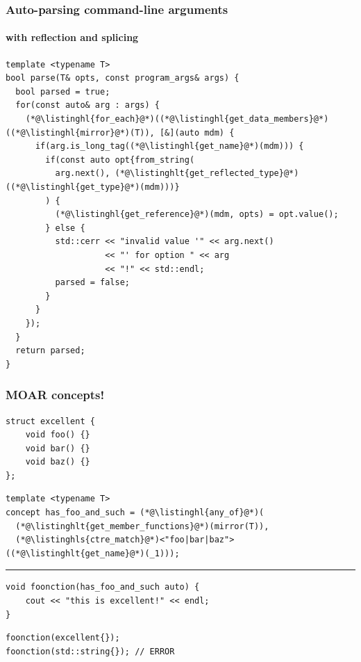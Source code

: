\documentclass[aspectratio=169,compress,table,xcolor=table]{beamer}
\begin{document}
\begin{frame}[fragile]
  \frametitle{Auto-parsing command-line arguments}
  \framesubtitle{with reflection and splicing}
  \begin{lstlisting}[language=c++2x,basicstyle=\scriptsize\ttfamily]
template <typename T>
bool parse(T& opts, const program_args& args) {
  bool parsed = true;
  for(const auto& arg : args) {
    (*@\listinghl{for_each}@*)((*@\listinghl{get_data_members}@*)((*@\listinghl{mirror}@*)(T)), [&](auto mdm) {
      if(arg.is_long_tag((*@\listinghl{get_name}@*)(mdm))) {
        if(const auto opt{from_string(
          arg.next(), (*@\listinghlt{get_reflected_type}@*)((*@\listinghl{get_type}@*)(mdm)))}
        ) {
          (*@\listinghl{get_reference}@*)(mdm, opts) = opt.value();
        } else {
          std::cerr << "invalid value '" << arg.next()
                    << "' for option " << arg
                    << "!" << std::endl;
          parsed = false;
        }
      }
    });
  }
  return parsed;
}
  \end{lstlisting}
\end{frame}
\begin{frame}[fragile]
  \frametitle{MOAR  concepts!}
  \begin{lstlisting}[language=c++2x,basicstyle=\small\ttfamily]
struct excellent {
    void foo() {}
    void bar() {}
    void baz() {}
};
  \end{lstlisting}
  \vfill
  \begin{lstlisting}[language=c++2x,basicstyle=\small\ttfamily]
template <typename T>
concept has_foo_and_such = (*@\listinghl{any_of}@*)(
  (*@\listinghlt{get_member_functions}@*)(mirror(T)),
  (*@\listinghls{ctre_match}@*)<"foo|bar|baz">((*@\listinghlt{get_name}@*)(_1)));
  \end{lstlisting}
  \hrule
  \vfill
  \begin{lstlisting}[language=c++2x,basicstyle=\small\ttfamily]
void foonction(has_foo_and_such auto) {
    cout << "this is excellent!" << endl;
}
  \end{lstlisting}
  \vfill
  \begin{lstlisting}[language=c++2x,basicstyle=\small\ttfamily]
foonction(excellent{});
foonction(std::string{}); // ERROR
  \end{lstlisting}
\end{frame}
\end{document}
